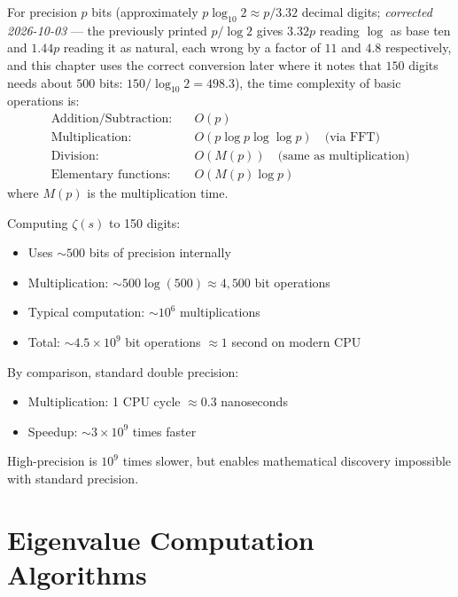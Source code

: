 \begin{thm}\label{thm:arith-complexity}
For precision $p$ bits (approximately $p\log_{10} 2 \approx p/3.32$ decimal
digits; \emph{corrected 2026-10-03} --- the previously printed $p/\log 2$ gives
$3.32p$ reading $\log$ as base ten and $1.44p$ reading it as natural, each wrong
by a factor of $11$ and $4.8$ respectively, and this chapter uses the correct
conversion later where it notes that $150$ digits needs about $500$ bits:
$150/\log_{10}2 = 498.3$), the time complexity of basic operations is:
\begin{align}
\text{Addition/Subtraction:} &\quad O(p) \\
\text{Multiplication:} &\quad O(p \log p \log\log p) \quad \text{(via FFT)} \\
\text{Division:} &\quad O(M(p)) \quad \text{(same as multiplication)} \\
\text{Elementary functions:} &\quad O(M(p) \log p)
\end{align}
where $M(p)$ is the multiplication time.
\end{thm}

\begin{example}
Computing $\zeta(s)$ to 150 digits:
\begin{itemize}
\item Uses $\sim 500$ bits of precision internally
\item Multiplication: $\sim 500 \log(500) \approx 4{,}500$ bit operations
\item Typical computation: $\sim 10^6$ multiplications
\item Total: $\sim 4.5 \times 10^9$ bit operations $\approx 1$ second on modern CPU
\end{itemize}

By comparison, standard double precision:
\begin{itemize}
\item Multiplication: 1 CPU cycle $\approx 0.3$ nanoseconds
\item Speedup: $\sim 3 \times 10^9$ times faster
\end{itemize}

High-precision is $10^9$ times slower, but enables mathematical discovery impossible with standard precision.
\end{example}

\section{Eigenvalue Computation Algorithms}
\label{sec:eigenvalue-algorithms}

